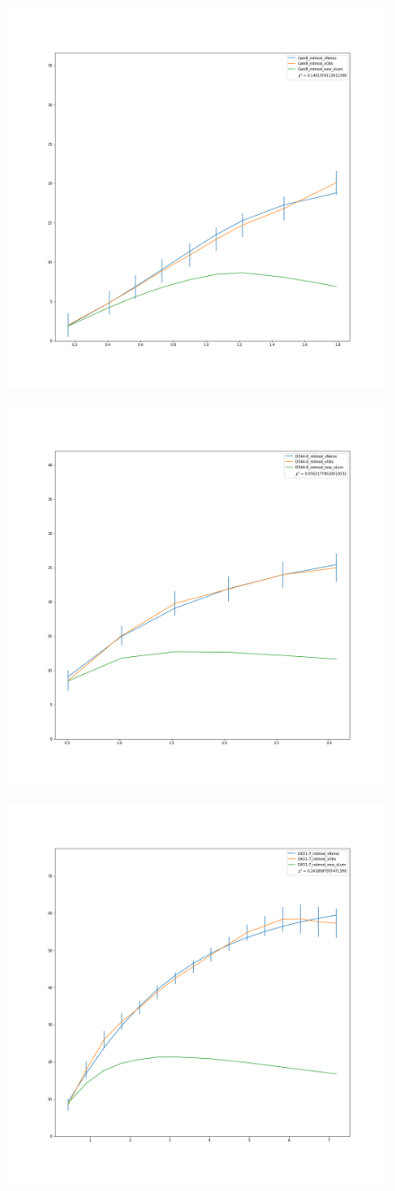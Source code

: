 \documentclass[reprint,%
 amsmath,amssymb,
 aps,
]{revtex4-1}
\begin{document}
 

\clearpage

\begin{figure}
\centering
\begin{minipage}{.5\textwidth}
  \centering
  \includegraphics[width=.49\linewidth]{figures/CamB_rotmod_XueSofue.png}
  \label{fig:test1}
\end{minipage}%
\begin{minipage}{.5\textwidth}
  \centering
  \includegraphics[width=.49\linewidth]{figures/D564-8_rotmod_XueSofue.png}
  \label{fig:test2}
\end{minipage}
\begin{minipage}{.5\textwidth}
  \centering
  \includegraphics[width=.4\linewidth]{figures/D631-7_rotmod_XueSofue.png}

\end{minipage}
\end{figure}
\end{document}
